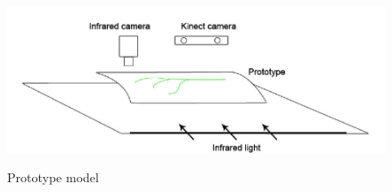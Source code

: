  \begin{figure}[h]
\caption{Prototype model}
\centering
    \includegraphics[width=1.0\textwidth]{images/prototype.png}
\label{fig:prototype}
\end{figure}